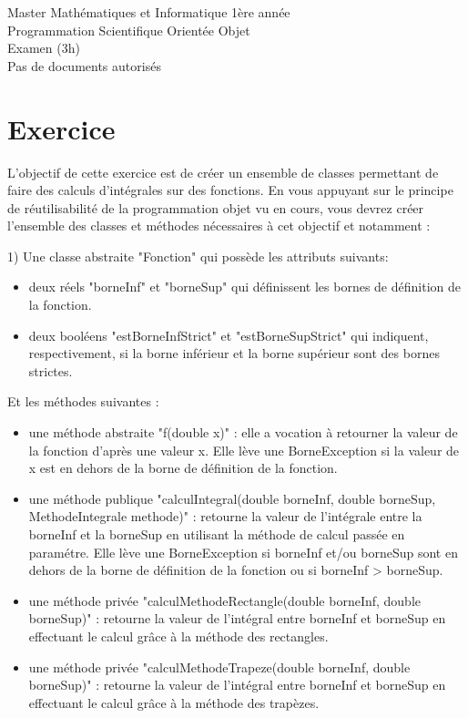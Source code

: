 \documentclass[a4paper,11pt]{article}
\begin{document}
\begin{center}
\Large{Master Mathématiques et Informatique 1ère année\\Programmation Scientifique Orientée Objet\\Examen (3h)\\Pas de documents autorisés}
\end{center}

\section*{Exercice}

L'objectif de cette exercice est de créer un ensemble de classes permettant de faire des calculs d'intégrales sur des fonctions. En vous appuyant sur le principe de réutilisabilité de la programmation objet vu en cours, vous devrez créer l'ensemble des classes et méthodes nécessaires à cet objectif et notamment :

1) Une classe abstraite "Fonction" qui possède les attributs suivants:
\begin{itemize}
  \item deux réels "borneInf" et "borneSup" qui définissent les bornes de définition de la fonction.
  \item deux booléens "estBorneInfStrict" et "estBorneSupStrict" qui indiquent, respectivement, si la borne inférieur et la borne supérieur sont des bornes strictes.
\end{itemize}

Et les méthodes suivantes :
\begin{itemize}
  \item une méthode abstraite "f(double x)" : elle a vocation à retourner la valeur de la fonction d'après une valeur x. Elle lève une BorneException si la valeur de x est en dehors de la borne de définition de la fonction.
  \item une méthode publique "calculIntegral(double borneInf, double borneSup, MethodeIntegrale methode)" : retourne la valeur de l'intégrale entre la borneInf et la borneSup en utilisant la méthode de calcul passée en paramétre. Elle lève une BorneException si borneInf et/ou borneSup sont en dehors de la borne de définition de la fonction ou si borneInf > borneSup.
  \item une méthode privée "calculMethodeRectangle(double borneInf, double borneSup)" : retourne la valeur de l'intégral entre borneInf et borneSup en effectuant le calcul grâce à la méthode des rectangles.
  \item une méthode privée "calculMethodeTrapeze(double borneInf, double borneSup)" : retourne la valeur de l'intégral entre borneInf et borneSup en effectuant le calcul grâce à la méthode des trapèzes.
\end{itemize}
\end{document}
